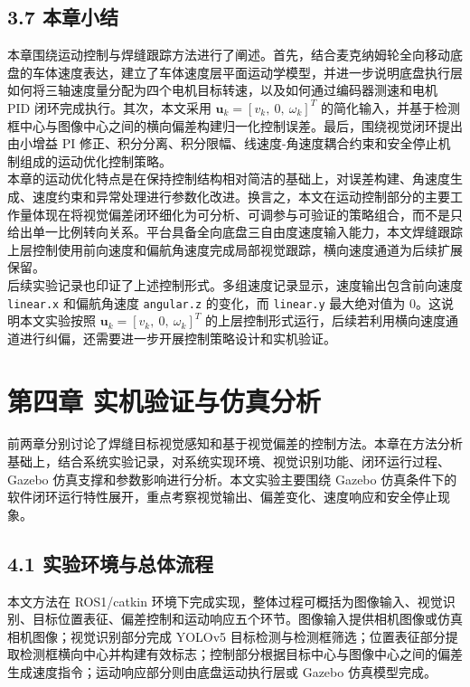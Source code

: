 \documentclass[UTF8,a4paper,12pt]{ctexrep}
\begin{document}
\section{3.7 本章小结}

本章围绕运动控制与焊缝跟踪方法进行了阐述。首先，结合麦克纳姆轮全向移动底盘的车体速度表达，建立了车体速度层平面运动学模型，并进一步说明底盘执行层如何将三轴速度量分配为四个电机目标转速，以及如何通过编码器测速和电机 PID 闭环完成执行。其次，本文采用 $\mathbf{u}_k=[v_k,\ 0,\ \omega_k]^T$ 的简化输入，并基于检测框中心与图像中心之间的横向偏差构建归一化控制误差。最后，围绕视觉闭环提出由小增益 PI 修正、积分分离、积分限幅、线速度-角速度耦合约束和安全停止机制组成的运动优化控制策略。\\

本章的运动优化特点是在保持控制结构相对简洁的基础上，对误差构建、角速度生成、速度约束和异常处理进行参数化改进。换言之，本文在运动控制部分的主要工作量体现在将视觉偏差闭环细化为可分析、可调参与可验证的策略组合，而不是只给出单一比例转向关系。平台具备全向底盘三自由度速度输入能力，本文焊缝跟踪上层控制使用前向速度和偏航角速度完成局部视觉跟踪，横向速度通道为后续扩展保留。\\

后续实验记录也印证了上述控制形式。多组速度记录显示，速度输出包含前向速度 \texttt{linear.x} 和偏航角速度 \texttt{angular.z} 的变化，而 \texttt{linear.y} 最大绝对值为 0。这说明本文实验按照 $\mathbf{u}_k=[v_k,\ 0,\ \omega_k]^T$ 的上层控制形式运行，后续若利用横向速度通道进行纠偏，还需要进一步开展控制策略设计和实机验证。\\

\chapter*{第四章 实机验证与仿真分析}

前两章分别讨论了焊缝目标视觉感知和基于视觉偏差的控制方法。本章在方法分析基础上，结合系统实验记录，对系统实现环境、视觉识别功能、闭环运行过程、Gazebo 仿真支撑和参数影响进行分析。本文实验主要围绕 Gazebo 仿真条件下的软件闭环运行特性展开，重点考察视觉输出、偏差变化、速度响应和安全停止现象。\\

\section{4.1 实验环境与总体流程}

本文方法在 ROS1/catkin 环境下完成实现，整体过程可概括为图像输入、视觉识别、目标位置表征、偏差控制和运动响应五个环节。图像输入提供相机图像或仿真相机图像；视觉识别部分完成 YOLOv5 目标检测与检测框筛选；位置表征部分提取检测框横向中心并构建有效标志；控制部分根据目标中心与图像中心之间的偏差生成速度指令；运动响应部分则由底盘运动执行层或 Gazebo 仿真模型完成。\\
\end{document}
